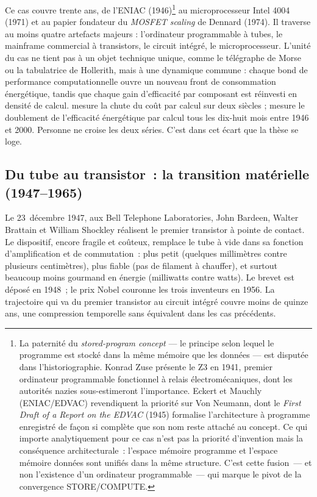 Ce cas couvre trente ans, de l'ENIAC (1946)\footnote{La paternité du \emph{stored-program concept} --- le principe selon lequel le programme est stocké dans la même mémoire que les données --- est disputée dans l'historiographie. Konrad Zuse présente le Z3 en 1941, premier ordinateur programmable fonctionnel à relais électromécaniques, dont les autorités nazies sous-estimeront l'importance. Eckert et Mauchly (ENIAC/EDVAC) revendiquent la priorité sur Von Neumann, dont le \emph{First Draft of a Report on the EDVAC} (1945) formalise l'architecture à programme enregistré de façon si complète que son nom reste attaché au concept. Ce qui importe analytiquement pour ce cas n'est pas la priorité d'invention mais la conséquence architecturale~: l'espace mémoire programme et l'espace mémoire données sont unifiés dans la même structure. C'est cette fusion~--- et non l'existence d'un ordinateur programmable~--- qui marque le pivot de la convergence STORE/COMPUTE.} au microprocesseur Intel 4004 (1971) et au papier fondateur du \emph{MOSFET scaling} de Dennard (1974). Il traverse au moins quatre artefacts majeurs : l'ordinateur programmable à tubes, le mainframe commercial à transistors, le circuit intégré, le microprocesseur. L'unité du cas ne tient pas à un objet technique unique, comme le télégraphe de Morse ou la tabulatrice de Hollerith, mais à une dynamique commune : chaque bond de performance computationnelle ouvre un nouveau front de consommation énergétique, tandis que chaque gain d'efficacité par composant est réinvesti en densité de calcul. \textcite{nordhaus_two_2007} mesure la chute du coût par calcul sur deux siècles ; \textcite{koomey_implications_2011} mesure le doublement de l'efficacité énergétique par calcul tous les dix-huit mois entre 1946 et 2000. Personne ne croise les deux séries. C'est dans cet écart que la thèse se loge.


\subsection{Du tube au transistor~: la transition matérielle (1947--1965)}\label{subsec:transistor}

%
Le 23~décembre 1947, aux Bell Telephone Laboratories, John Bardeen, Walter Brattain et William Shockley réalisent le premier transistor à pointe de contact. Le dispositif, encore fragile et coûteux, remplace le tube à vide dans sa fonction d'amplification et de commutation~: plus petit (quelques millimètres contre plusieurs centimètres), plus fiable (pas de filament à chauffer), et surtout beaucoup moins gourmand en énergie (milliwatts contre watts). Le brevet est déposé en 1948~; le prix Nobel couronne les trois inventeurs en 1956. La trajectoire qui va du premier transistor au circuit intégré couvre moins de quinze ans, une compression temporelle sans équivalent dans les cas précédents.

